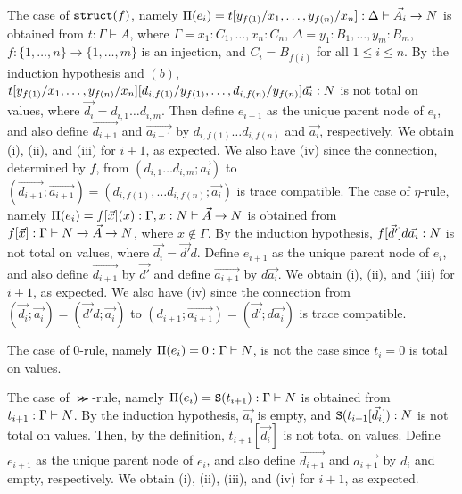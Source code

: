 \documentclass{article}
\newenvironment{proof}[1][Proof]{\begin{trivlist}
\item[\hskip \labelsep {\bfseries #1}]}{\end{trivlist}}
\begin{document}
\begin{proof}
  The case of ${\tt struct}(f)$, namely
  $\Pi(e_i) = t[y_{f(1)}/x_1,\ldots,y_{f(n)}/x_n]:\Delta\vdash \vec{A_i}\rightarrow{N}$
  is obtained from $t:\Gamma\vdash A$, where
  $\Gamma = x_1:C_1,\ldots,x_n:C_n$, $\Delta = y_1:B_1,\ldots,y_m:B_m$, 
  $f:\{1,\ldots,n\}\to\{1,\ldots,m\}$ is an injection, and $C_i=B_{f(i)}$ for all $1\le i\le n$.
  By the induction hypothesis and $(b)$,
  $t[y_{f(1)}/x_1,\ldots,y_{f(n)}/x_n][d_{i,f(1)}/y_{f(1)},\ldots,d_{i,f(n)}/y_{f(n)}]\vec{a_i}:{N}$ is not total on values, where $\vec{d_i} = d_{i,1}\ldots d_{i,m}$.
  Then define $e_{i+1}$ as the unique parent node of $e_i$, and
  also define $\vec{d_{i+1}}$ and $\vec{a_{i+1}}$ by $d_{i,f(1)}\ldots d_{i,f(n)}$
  and $\vec{a_i}$, respectively. 
  We obtain (i), (ii), and (iii) for $i+1$, as expected.
  We also have (iv) since the connection, determined by $f$, from
  $(d_{i,1}\ldots d_{i,m};\vec{a_i})$ to $(\vec{d_{i+1}};\vec{a_{i+1}}) = (d_{i,f(1)},\ldots d_{i,f(n)};\vec{a_i})$
  is trace compatible. 
  The case of $\eta$-rule, namely 
  $\Pi(e_i) = f[\vec{x}](x): \Gamma,x:N\vdash \vec{A}\rightarrow{N}$ is obtained from
  $f[\vec{x}]:\Gamma\vdash N\rightarrow \vec{A} \rightarrow {N}$, where
  $x\not\in\Gamma$.
  By the induction hypothesis, $f[\vec{d'}]d\vec{a_i}:{N}$ is not total on values,
  where $\vec{d_i} = \vec{d'}d$.
  Define $e_{i+1}$ as the unique parent node of $e_i$, and
  also define $\vec{d_{i+1}}$ by $\vec{d'}$ and define $\vec{a_{i+1}}$ by $d\vec{a_i}$. 
  We obtain (i), (ii), and (iii) for $i+1$, as expected.
  We also have (iv) since the connection from
  $(\vec{d_i};\vec{a_i}) = (\vec{d'}d;\vec{a_i})$ to
  $(d_{i+1};\vec{a_{i+1}}) = (\vec{d'};d\vec{a_i})$
  is trace compatible. 

  The case of $0$-rule, namely $\Pi(e_i) = 0:\Gamma\vdash {N}$, is not the case since $t_i = 0$ is total on values.
  
  The case of $\Succ$-rule, namely $\Pi(e_i) = {\tt S}(t_{i+1}):\Gamma\vdash {N}$ is obtained from
  $t_{i+1}:\Gamma\vdash {N}$.
  By the induction hypothesis, $\vec{a_i}$ is empty, and 
  ${\tt S}(t_{i+1}[\vec{d_i}]):{N}$ is not total on values.
  Then, by the definition, $t_{i+1}[\vec{d_i}]$ is not total on values. 
  Define $e_{i+1}$ as the unique parent node of $e_i$, and
  also define $\vec{d_{i+1}}$ and $\vec{a_{i+1}}$ by $d_i$ and empty, respectively. 
  We obtain (i), (ii), (iii), and (iv) for $i+1$, as expected.


\end{proof}
\end{document}
